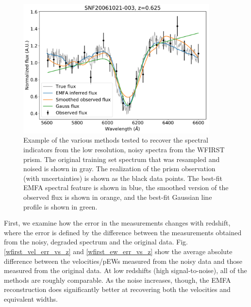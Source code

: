 \begin{figure}[htbp]
    \centering
    \includegraphics[width=0.9\textwidth]{figures/si_feat_pca/example_wfirst_emfa_recovery.pdf}
    \caption{Example of the various methods tested to recover the spectral indicators from the low resolution, noisy spectra from the WFIRST prism. The original training set spectrum that was resampled and noised is shown in gray. The realization of the prism observation (with uncertainties) is shown as the black data points. The best-fit EMFA spectral feature is shown in blue, the smoothed version of the observed flux is shown in orange, and the best-fit Gaussian line profile is shown in green.}
    \label{example_wfirst_recovery}
\end{figure}

First, we examine how the error in the measurements changes with redshift, where the error is defined by the difference between the measurements obtained from the noisy, degraded spectrum and the original data. Fig. \ref{wfirst_vel_err_vs_z} and \ref{wfirst_ew_err_vs_z} show the average absolute difference between the velocities/pEWs measured from the noisy data and those measured from the original data. At low redshifts (high signal-to-noise), all of the methods are roughly comparable. As the noise increases, though, the EMFA reconstruction does significantly better at recovering both the velocities and equivalent widths.

